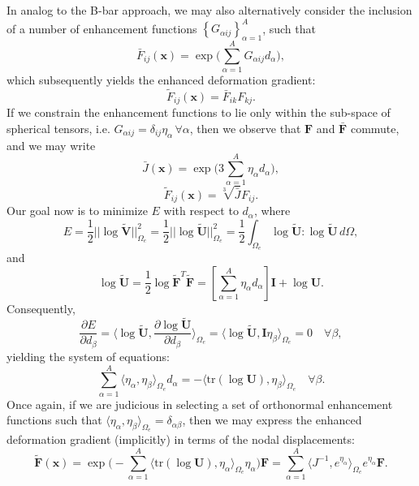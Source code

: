 In analog to the B-bar approach, we may also alternatively consider the inclusion of a number of enhancement functions $\left\{ G_{\alpha ij} \right\}_{\alpha = 1}^A$, such that
\begin{equation}
  \bar{F}_{ij} (\mathbf{x}) = \exp \bigg( \sum_{\alpha = 1}^A G_{\alpha ij} d_{\alpha} \bigg),
\end{equation}
which subsequently yields the enhanced deformation gradient:
\begin{equation}
  \tilde{F}_{ij} (\mathbf{x}) = \bar{F}_{ik} F_{kj}.
\end{equation}
If we constrain the enhancement functions to lie only within the sub-space of spherical tensors, i.e. $G_{\alpha ij} = \delta_{ij} \eta_{\alpha} \, \forall \alpha$, then we observe that $\mathbf{F}$ and $\bar{\mathbf{F}}$ commute, and we may write
\begin{equation}
  \bar{J} (\mathbf{x}) = \exp \bigg( 3 \sum_{\alpha = 1}^A \eta_{\alpha} d_{\alpha} \bigg),
\end{equation}
\begin{equation}
  \tilde{F}_{ij} (\mathbf{x}) = \sqrt[3]{\bar{J}} F_{ij}.
\end{equation}
Our goal now is to minimize $E$ with respect to $d_\alpha$, where
\begin{equation}
  E = \frac{1}{2} || \log \tilde{\mathbf{V}} ||^2_{\Omega_e} = \frac{1}{2} || \log \tilde{\mathbf{U}} ||^2_{\Omega_e} = \frac{1}{2} \int_{\Omega_e} \log \tilde{\mathbf{U}} \colon \log \tilde{\mathbf{U}} \, d \Omega,
\end{equation}
and
\begin{equation}
  \log \tilde{\mathbf{U}} = \frac{1}{2} \log \tilde{\mathbf{F}}^T \tilde{\mathbf{F}} = \left[ \sum_{\alpha = 1}^A \eta_{\alpha} d_{\alpha} \right] \mathbf{I} + \log \mathbf{U}.
\end{equation}
Consequently,
\begin{equation}
  \frac{\partial E}{\partial d_{\beta}} = \langle \log \tilde{\mathbf{U}}, \frac{\partial \log \tilde{\mathbf{U}}}{\partial d_{\beta}} \rangle_{\Omega_e} = \langle \log \tilde{\mathbf{U}}, \mathbf{I} \eta_{\beta} \rangle_{\Omega_e} = 0 \quad \forall \beta,
\end{equation}
yielding the system of equations:
\begin{equation}
  \sum_{\alpha=1}^A \langle \eta_{\alpha}, \eta_{\beta} \rangle_{\Omega_e} d_{\alpha} = - \langle \text{tr} (\log \mathbf{U}), \eta_{\beta} \rangle_{\Omega_e} \quad \forall \beta.
\end{equation}
Once again, if we are judicious in selecting a set of orthonormal enhancement functions such that $\langle \eta_{\alpha}, \eta_{\beta} \rangle_{\Omega_e} = \delta_{\alpha \beta}$, then we may express the enhanced deformation gradient (implicitly) in terms of the nodal displacements:
\begin{equation}
  \tilde{\mathbf{F}} (\mathbf{x}) = \exp \bigg( - \sum_{\alpha = 1}^A \langle \text{tr} (\log \mathbf{U}), \eta_{\alpha} \rangle_{\Omega_e} \eta_{\alpha} \bigg) \mathbf{F} = \sum_{\alpha = 1}^A \langle J^{-1}, e^{\eta_{\alpha}} \rangle_{\Omega_e} e^{\eta_{\alpha}} \mathbf{F}.
\end{equation}

